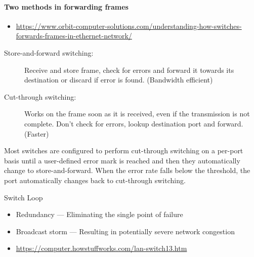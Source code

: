 \paragraph{Two methods in forwarding frames}
\begin{itemize}
\item \url{https://www.orbit-computer-solutions.com/understanding-how-switches-forwards-frames-in-ethernet-network/}
\end{itemize}
\begin{description}
\item[Store-and-forward switching:] Receive and store frame, check for errors and forward
  it towards its destination or discard if error is found. (Bandwidth efficient)
\item[Cut-through switching:] Works on the frame soon as it is received, even if the
  transmission is not complete. Don't check for errors, lookup destination port and
  forward. (Faster)
\end{description}
Most switches are configured to perform cut-through switching on a per-port basis until a
user-defined error mark is reached and then they automatically change to
store-and-forward. When the error rate falls below the threshold, the port automatically
changes back to cut-through switching.

\begin{frame}{Switch Loop}
  \begin{itemize}
  \item[{\Large \good}] Redundancy --- Eliminating the single point of failure
  \item[{\Large \textcolor{red}{\bad}}] Broadcast storm --- Resulting in potentially severe network congestion
  \end{itemize}
  \centering
\end{frame}

\begin{itemize}
\item \url{https://computer.howstuffworks.com/lan-switch13.htm}
\end{itemize}

